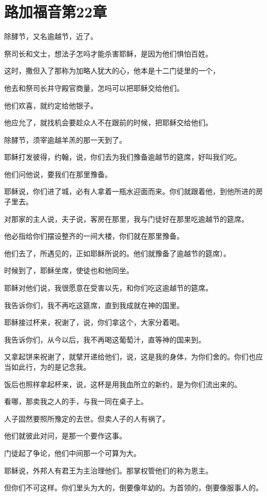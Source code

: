\documentclass[12pt,oneside]{book}
\begin{document}
\chapter{路加福音第22章}
除酵节，又名逾越节，近了。

祭司长和文士，想法子怎吗才能杀害耶稣，是因为他们惧怕百姓。

这时，撒但入了那称为加略人犹大的心，他本是十二门徒里的一个，

他去和祭司长并守殿官商量，怎吗可以把耶稣交给他们。

他们欢喜，就约定给他银子。

他应允了，就找机会要趁众人不在跟前的时候，把耶稣交给他们。

除酵节，须宰逾越羊羔的那一天到了。

耶稣打发彼得，约翰，说，你们去为我们豫备逾越节的筵席，好叫我们吃。

他们问他说，要我们在那里豫备。

耶稣说，你们进了城，必有人拿着一瓶水迎面而来。你们就跟着他，到他所进的房子里去。

对那家的主人说，夫子说，客房在那里，我与门徒好在那里吃逾越节的筵席。

他必指给你们摆设整齐的一间大楼，你们就在那里豫备。

他们去了，所遇见的，正如耶稣所说的。他们就豫备了逾越节的筵席）。

时候到了，耶稣坐席，使徒也和他同坐。

耶稣对他们说，我很愿意在受害以先，和你们吃这逾越节的筵席。

我告诉你们，我不再吃这筵席，直到我成就在神的国里。

耶稣接过杯来，祝谢了，说，你们拿这个，大家分着喝。

我告诉你们，从今以后，我不再喝这葡萄汁，直等神的国来到。

又拿起饼来祝谢了，就擘开递给他们，说，这是我的身体，为你们舍的。你们也应当如此行，为的是记念我。

饭后也照样拿起杯来，说，这杯是用我血所立的新约，是为你们流出来的。

看哪，那卖我之人的手，与我一同在桌子上。

人子固然要照所豫定的去世。但卖人子的人有祸了。

他们就彼此对问，是那一个要作这事。

门徒起了争论，他们中间那一个可算为大。

耶稣说，外邦人有君王为主治理他们。那掌权管他们的称为恩主。

但你们不可这样。你们里头为大的，倒要像年幼的。为首领的，倒要像服事人的。
\end{document}
